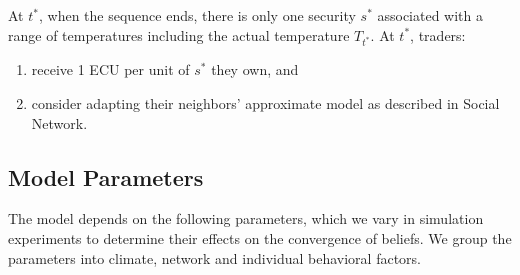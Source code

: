 \documentclass{wscpaperproc}\usepackage[]{graphicx}\usepackage[]{color}
\begin{document}
At $t^*$, when the sequence ends, there is only one security $s^*$ associated with a range of temperatures including the actual temperature $T_{t^*}$. 
At $t^*$, traders:

\begin{enumerate}
  \item  receive 1 ECU per unit of $s^*$ they own, and
  \item consider adapting their neighbors' approximate model as described in Social Network.
\end{enumerate}

\subsection{Model Parameters}
  
The model depends on the following parameters, which we vary in simulation experiments to determine their effects on the convergence of beliefs. We group the parameters into climate, network and individual behavioral factors.
\end{document}
